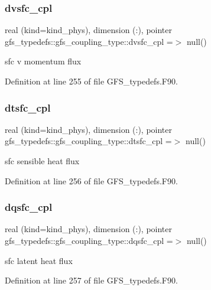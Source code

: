\subsubsection{dvsfc\+\_\+cpl}
{\footnotesize\ttfamily real (kind=kind\+\_\+phys), dimension (\+:), pointer gfs\+\_\+typedefs\+::gfs\+\_\+coupling\+\_\+type\+::dvsfc\+\_\+cpl =$>$ null()}



sfc v momentum flux 



Definition at line 255 of file G\+F\+S\+\_\+typedefs.\+F90.

\mbox{\label{structgfs__typedefs_1_1gfs__coupling__type_a5e103da61030d1aec263729066fc28c4}} 
\subsubsection{dtsfc\+\_\+cpl}
{\footnotesize\ttfamily real (kind=kind\+\_\+phys), dimension (\+:), pointer gfs\+\_\+typedefs\+::gfs\+\_\+coupling\+\_\+type\+::dtsfc\+\_\+cpl =$>$ null()}



sfc sensible heat flux 



Definition at line 256 of file G\+F\+S\+\_\+typedefs.\+F90.

\mbox{\label{structgfs__typedefs_1_1gfs__coupling__type_ac9f309c9120dfa9cacbdaa01289356ad}} 
\subsubsection{dqsfc\+\_\+cpl}
{\footnotesize\ttfamily real (kind=kind\+\_\+phys), dimension (\+:), pointer gfs\+\_\+typedefs\+::gfs\+\_\+coupling\+\_\+type\+::dqsfc\+\_\+cpl =$>$ null()}



sfc latent heat flux 



Definition at line 257 of file G\+F\+S\+\_\+typedefs.\+F90.

